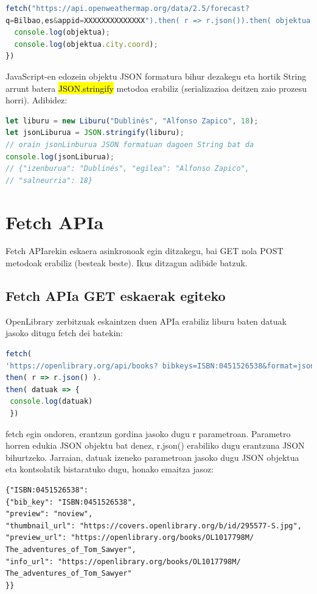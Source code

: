 \begin{lstlisting}[language=JavaScript]
fetch("https://api.openweathermap.org/data/2.5/forecast?
q=Bilbao,es&appid=XXXXXXXXXXXXXX").then( r => r.json()).then( objektua => {
  console.log(objektua);
  console.log(objektua.city.coord);
})
\end{lstlisting}

JavaScript-en edozein objektu JSON formatura bihur dezakegu eta hortik String arrunt batera \hl{JSON.stringify} metodoa erabiliz (serializazioa deitzen zaio prozesu horri). Adibidez:

\begin{lstlisting}[language=JavaScript]
let liburu = new Liburu("Dublinés", "Alfonso Zapico", 18);
let jsonLiburua = JSON.stringify(liburu);
// orain jsonLinburua JSON formatuan dagoen String bat da
console.log(jsonLiburua);
// {"izenburua": "Dublinés", "egilea": "Alfonso Zapico",
// "salneurria": 18}
\end{lstlisting}

\section{Fetch APIa}

Fetch APIarekin eskaera asinkronoak egin ditzakegu, bai GET nola POST metodoak erabiliz (besteak beste). Ikus ditzagun adibide batzuk.

\subsection{Fetch APIa GET eskaerak egiteko}

OpenLibrary zerbitzuak eskaintzen duen APIa erabiliz liburu baten datuak jasoko ditugu fetch dei batekin:

\begin{lstlisting}[language=JavaScript]
fetch(
'https://openlibrary.org/api/books? bibkeys=ISBN:0451526538&format=json').
then( r => r.json() ).
then( datuak => { 
 console.log(datuak) 
 })
\end{lstlisting}

fetch egin ondoren, erantzun gordina jasoko dugu r parametroan. Parametro horren edukia JSON objektu bat denez, r.json() erabiliko dugu erantzuna JSON bihurtzeko. Jarraian, datuak izeneko parametroan jasoko dugu JSON objektua eta kontsolatik bistaratuko dugu, honako emaitza jasoz:

\begin{lstlisting}
{"ISBN:0451526538": 
{"bib_key": "ISBN:0451526538", 
"preview": "noview", 
"thumbnail_url": "https://covers.openlibrary.org/b/id/295577-S.jpg",
"preview_url": "https://openlibrary.org/books/OL1017798M/ The_adventures_of_Tom_Sawyer", 
"info_url": "https://openlibrary.org/books/OL1017798M/ The_adventures_of_Tom_Sawyer"
}}
\end{lstlisting}

